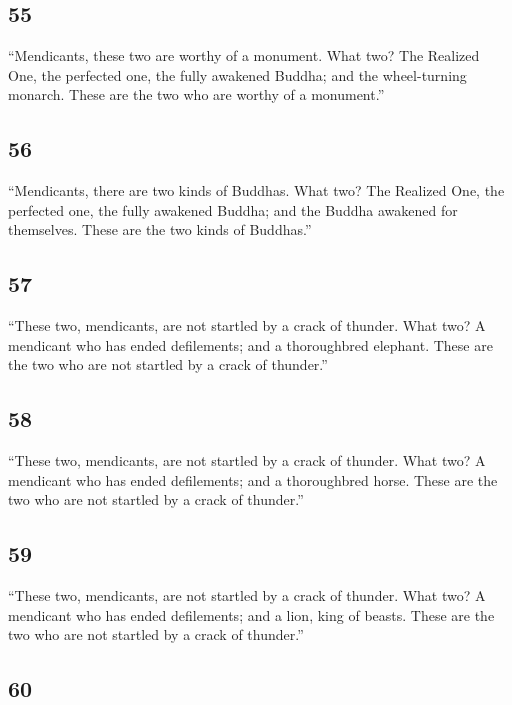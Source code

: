 \documentclass[12pt,openany]{book}%
\begin{document}
\subsection*{55 }

“Mendicants, these two are worthy of a monument. What two? The Realized One, the perfected one, the fully awakened Buddha; and the wheel-turning monarch. These are the two who are worthy of a monument.” 

\subsection*{56 }

“Mendicants, there are two kinds of Buddhas. What two? The Realized One, the perfected one, the fully awakened Buddha; and the Buddha awakened for themselves. These are the two kinds of Buddhas.” 

\subsection*{57 }

“These two, mendicants, are not startled by a crack of thunder. What two? A mendicant who has ended defilements; and a thoroughbred elephant. These are the two who are not startled by a crack of thunder.” 

\subsection*{58 }

“These two, mendicants, are not startled by a crack of thunder. What two? A mendicant who has ended defilements; and a thoroughbred horse. These are the two who are not startled by a crack of thunder.” 

\subsection*{59 }

“These two, mendicants, are not startled by a crack of thunder. What two? A mendicant who has ended defilements; and a lion, king of beasts. These are the two who are not startled by a crack of thunder.” 

\subsection*{60 }
\end{document}
